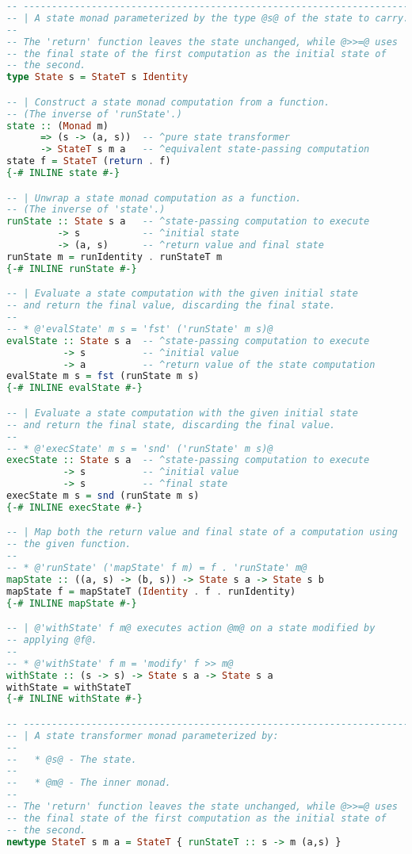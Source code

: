 \begin{lstlisting}[language=Haskell]
-- ---------------------------------------------------------------------------
-- | A state monad parameterized by the type @s@ of the state to carry.
--
-- The 'return' function leaves the state unchanged, while @>>=@ uses
-- the final state of the first computation as the initial state of
-- the second.
type State s = StateT s Identity

-- | Construct a state monad computation from a function.
-- (The inverse of 'runState'.)
state :: (Monad m)
      => (s -> (a, s))  -- ^pure state transformer
      -> StateT s m a   -- ^equivalent state-passing computation
state f = StateT (return . f)
{-# INLINE state #-}

-- | Unwrap a state monad computation as a function.
-- (The inverse of 'state'.)
runState :: State s a   -- ^state-passing computation to execute
         -> s           -- ^initial state
         -> (a, s)      -- ^return value and final state
runState m = runIdentity . runStateT m
{-# INLINE runState #-}

-- | Evaluate a state computation with the given initial state
-- and return the final value, discarding the final state.
--
-- * @'evalState' m s = 'fst' ('runState' m s)@
evalState :: State s a  -- ^state-passing computation to execute
          -> s          -- ^initial value
          -> a          -- ^return value of the state computation
evalState m s = fst (runState m s)
{-# INLINE evalState #-}

-- | Evaluate a state computation with the given initial state
-- and return the final state, discarding the final value.
--
-- * @'execState' m s = 'snd' ('runState' m s)@
execState :: State s a  -- ^state-passing computation to execute
          -> s          -- ^initial value
          -> s          -- ^final state
execState m s = snd (runState m s)
{-# INLINE execState #-}

-- | Map both the return value and final state of a computation using
-- the given function.
--
-- * @'runState' ('mapState' f m) = f . 'runState' m@
mapState :: ((a, s) -> (b, s)) -> State s a -> State s b
mapState f = mapStateT (Identity . f . runIdentity)
{-# INLINE mapState #-}

-- | @'withState' f m@ executes action @m@ on a state modified by
-- applying @f@.
--
-- * @'withState' f m = 'modify' f >> m@
withState :: (s -> s) -> State s a -> State s a
withState = withStateT
{-# INLINE withState #-}

-- ---------------------------------------------------------------------------
-- | A state transformer monad parameterized by:
--
--   * @s@ - The state.
--
--   * @m@ - The inner monad.
--
-- The 'return' function leaves the state unchanged, while @>>=@ uses
-- the final state of the first computation as the initial state of
-- the second.
newtype StateT s m a = StateT { runStateT :: s -> m (a,s) }


\end{lstlisting}
